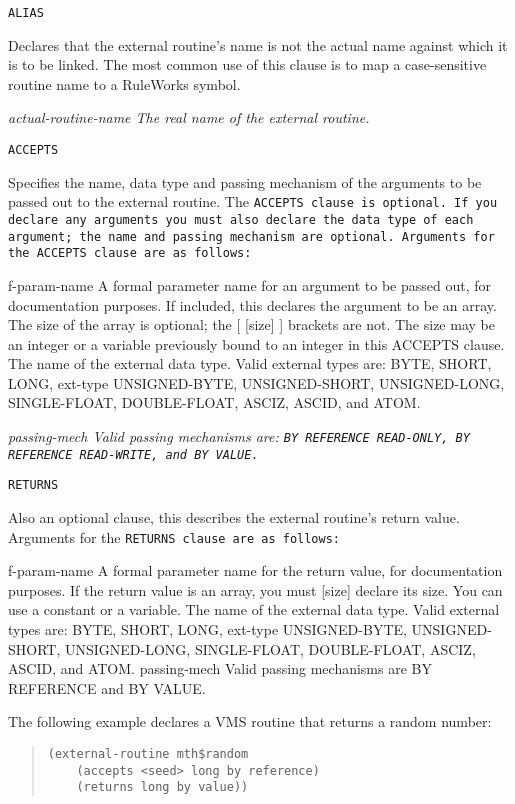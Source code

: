\Clauses

\tt{ALIAS}

Declares that the external routine's name is not the actual name
against which it is to be linked. The most common use of this clause
is to map a case-sensitive routine name to a RuleWorks symbol.

\it{actual-routine-name} The real name of the external routine.

\tt{ACCEPTS}

Specifies the name, data type and passing mechanism of the arguments
to be passed out to the external routine. The \tt{ACCEPTS} clause is
optional. If you declare any arguments you must also declare the data
type of each argument; the name and passing mechanism are
optional. Arguments for the \tt{ACCEPTS} clause are as follows:

f-param-name A formal parameter name for an argument to be
passed out, for documentation purposes.
If included, this declares the argument to be an
array. The size of the array is optional; the
[ [size] ]   brackets are not. The size may be an integer or
a variable previously bound to an integer in
this ACCEPTS clause.
The name of the external data type. Valid
external types are: BYTE, SHORT, LONG,
ext-type     UNSIGNED-BYTE, UNSIGNED-SHORT, UNSIGNED-LONG,
SINGLE-FLOAT, DOUBLE-FLOAT, ASCIZ, ASCID, and
ATOM.

\it{passing-mech} Valid passing mechanisms are: \tt{BY REFERENCE
  READ-ONLY}, \tt{BY REFERENCE READ-WRITE}, and \tt{BY VALUE}.

\tt{RETURNS}

Also an optional clause, this describes the external routine's return
value. Arguments for the \tt{RETURNS} clause are as follows:

f-param-name A formal parameter name for the return value,
for documentation purposes.
If the return value is an array, you must
[size]       declare its size. You can use a constant or a
variable.
The name of the external data type. Valid
external types are: BYTE, SHORT, LONG,
ext-type     UNSIGNED-BYTE, UNSIGNED-SHORT, UNSIGNED-LONG,
SINGLE-FLOAT, DOUBLE-FLOAT, ASCIZ, ASCID, and
ATOM.
passing-mech Valid passing mechanisms are BY REFERENCE and BY
VALUE.

\Example

The following example declares a VMS routine that returns a
random number:
\begin{quote}
\begin{verbatim}
(external-routine mth$random
    (accepts <seed> long by reference)
    (returns long by value))
\end{verbatim}
\end{quote}

